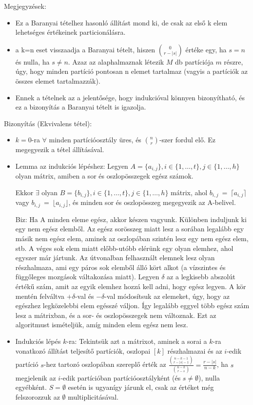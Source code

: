 Megjegyzések:
\begin{itemize}
  \item Ez a Baranyai tételhez hasonló állítást mond ki, de csak az első k elem lehetséges értékeinek particionálásra.
  \item a k=n eset visszaadja a Baranyai tételt, hiszen $\binom{0}{r-|s|}$ értéke egy, ha $s=n$ és nulla, ha $s \neq n$. Azaz az alaphalmaznak létezik $M$ db partíciója $m$ részre, úgy, hogy minden partíció pontosan n elemet tartalmaz (vagyis a partíciók az összes elemet tartalmazzák).
  \item Ennek a tételnek az a jelentősége, hogy indukcióval könnyen bizonyítható, és ez a bizonyítás a Baranyai tételt is igazolja.
\end{itemize}

Bizonyítás (Ekvivalens tétel):
\begin{itemize}
  \item $k=0$-ra $\forall$ minden partícióosztály üres, és $\binom{n}{r}$-szer fordul elő. Ez megegyezik a tétel állításával.

  \item Lemma az indukciós lépéshez:
  Legyen $A = \{a_{i,j}\}, i \in \{1, \dots, t\}, j \in \{1, \dots, h\}$ olyan mátrix, amiben a sor és oszlopösszegek egész számok.

  Ekkor $\exists$ olyan $B = \{b_{i,j}\}, i \in \{1, \dots, t\}, j \in \{1, \dots, h\}$ mátrix, ahol $b_{i,j}~=~\lceil a_{i,j} \rceil$ vagy $b_{i,j}~=~\lfloor a_{i,j} \rfloor$, és minden sor és oszlopösszeg megegyezik az A-belivel.

  Biz: Ha A minden eleme egész, akkor készen vagyunk. Különben induljunk ki egy nem egész elemből. Az egész sorösszeg miatt lesz a sorában legalább egy másik nem egész elem, aminek az oszlopában szintén lesz egy nem egész elem, stb. A véges sok elem miatt előbb-utóbb elérünk egy olyan elemhez, ahol egyszer már jártunk. Az útvonalban felhasznált elemnek lesz olyan részhalmaza, ami egy páros sok elemből álló kört alkot (a vízszintes és függőleges mozgások váltakozása miatt). Legyen $\delta$ az a legkisebb abszolút értékű szám, amit az egyik elemhez hozzá kell adni, hogy egész legyen. A kör mentén felváltva $+\delta$-val és $-\delta$-val módosítsuk az elemeket, úgy, hogy az egészhez legközelebbi elem egésszé váljon. Így legalább eggyel több egész szám lesz a mátrixban, és a sor- és oszlopösszegek nem változnak. Ezt az algoritmust ismételjük, amíg minden elem egész nem lesz.

  \item Indukciós lépés $k$-ra:
  Tekintsük azt a mátrixot, aminek a sorai a $k$-ra vonatkozó állítást teljesítő partíciók, oszlopai $[k]$ részhalmazai és az $i$-edik partíció $s$-hez tartozó oszlopában szereplő érték az $\frac{\binom{n-k-1}{r-|s|-1}}{\binom{n-k}{r-s}} = \frac{r-|s|}{n-k}$, ha $s$ megjelenik az $i$-edik partícióban partícióosztályként (és $s \neq \emptyset$), nulla egyébként. $S = \emptyset$ esetén is ugyanígy járunk el, csak az értéket még felszorozzuk az $\emptyset$ multiplicitásával.


\end{itemize}
